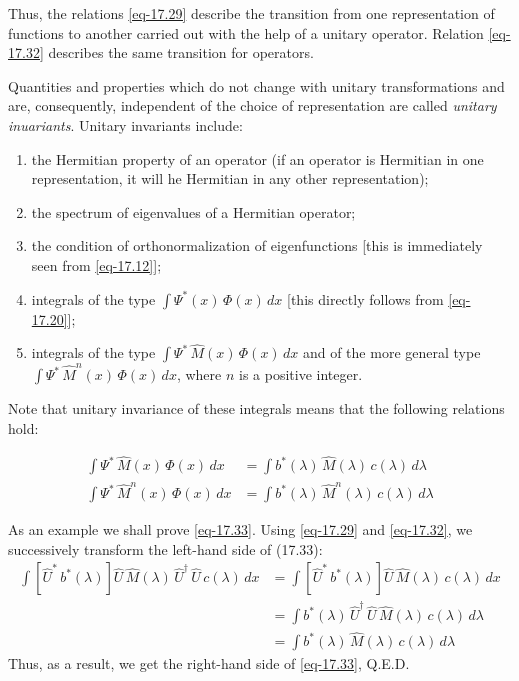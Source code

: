 \documentclass[a4paper,sfsidenotes,colorlinks=true]{tufte-book}
\numberwithin{equation}{section}
\numberwithin{figure}{section}
\begin{document}
Thus, the relations \ref{eq-17.29} describe the transition from one
representation of functions to another carried out with the help of a
unitary operator. Relation \ref{eq-17.32} describes the same
transition for operators.

Quantities and properties which do not
change with unitary transformations and are, consequently, independent
of the choice of representation are called \emph{unitary inuariants}. Unitary
invariants include: 
\begin{enumerate}[label=(\alph*), leftmargin=1cm]
\item the Hermitian property of an operator (if an operator is
  Hermitian in one representation, it will he Hermitian in any other
  representation);
\item the spectrum of eigenvalues of a Hermitian operator;
\item the condition of orthonormalization of eigenfunctions [this is
  immediately seen from \ref{eq-17.12}];
\item integrals of the type $\int \Psi^{*} (x) \, \Phi (x) \, dx $ [this directly
  follows from \ref{eq-17.20}];
\item integrals of the type $\int \Psi^{*} \, \hat{M} (x) \, \Phi(x)
  \, dx$ and of the more general type $\int \Psi^{*} \, \hat{M}^{n} (x) \, \Phi(x)
  \, dx $, where $n$ is a positive integer.
\end{enumerate}

Note that unitary invariance of these integrals means that the
following relations hold:

\begin{align}%
\int \Psi^{*} \, \hat{M}(x) \, \Phi(x) \, dx & = \int b^{*}(\lambda) \,
\hat{M} (\lambda) \, c (\lambda) \, d \lambda   
\label{eq-17.33} \\
\int \Psi^{*} \, \hat{M}^{n}(x) \, \Phi(x) \, dx & = \int b^{*}(\lambda) \,
\hat{M}^{n} (\lambda) \, c (\lambda) \, d \lambda 
\label{eq-17.34} 
\end{align}

As an example we shall prove \ref{eq-17.33}. Using \ref{eq-17.29} and
\ref{eq-17.32}, we successively transform the left-hand side of
(17.33): 
\begin{equation*}
\begin{split}
\int \left[ \hat{U}^{*}\, b^{*}(\lambda)  \right] \hat{U} \, \hat{M}
(\lambda) \, \hat{U}^{\dagger} \, \hat{U} \, c(\lambda) \, dx & = 
\int \left[ \hat{U}^{*}\, b^{*}(\lambda)  \right] \hat{U} \, \hat{M}
(\lambda) \, c(\lambda) \, dx\\
& = \int b^{*}(\lambda) \, \hat{U}^{\dagger} \, \hat{U} \, \hat{M}
(\lambda) \, c (\lambda) \, d \lambda \\
& = \int b^{*}(\lambda) \, \hat{M}(\lambda) \, c(\lambda) \, d \lambda
\end{split}
\end{equation*}
Thus, as a result, we get the right-hand side of \ref{eq-17.33}, Q.E.D.  
\end{document}
